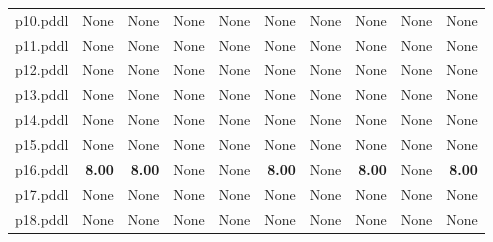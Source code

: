 \documentclass{article}
\begin{document}
\begin{tabular}{@{}lrrrrrrrrr@{}}
p10.pddl & \multicolumn{1}{|l|}{None} & \multicolumn{1}{|l|}{None} & \multicolumn{1}{|l|}{None} & \multicolumn{1}{|l|}{None} & \multicolumn{1}{|l|}{None} & \multicolumn{1}{|l|}{None} & \multicolumn{1}{|l|}{None} & \multicolumn{1}{|l|}{None} & \multicolumn{1}{|l|}{None} \\
p11.pddl & \multicolumn{1}{|l|}{None} & \multicolumn{1}{|l|}{None} & \multicolumn{1}{|l|}{None} & \multicolumn{1}{|l|}{None} & \multicolumn{1}{|l|}{None} & \multicolumn{1}{|l|}{None} & \multicolumn{1}{|l|}{None} & \multicolumn{1}{|l|}{None} & \multicolumn{1}{|l|}{None} \\
p12.pddl & \multicolumn{1}{|l|}{None} & \multicolumn{1}{|l|}{None} & \multicolumn{1}{|l|}{None} & \multicolumn{1}{|l|}{None} & \multicolumn{1}{|l|}{None} & \multicolumn{1}{|l|}{None} & \multicolumn{1}{|l|}{None} & \multicolumn{1}{|l|}{None} & \multicolumn{1}{|l|}{None} \\
p13.pddl & \multicolumn{1}{|l|}{None} & \multicolumn{1}{|l|}{None} & \multicolumn{1}{|l|}{None} & \multicolumn{1}{|l|}{None} & \multicolumn{1}{|l|}{None} & \multicolumn{1}{|l|}{None} & \multicolumn{1}{|l|}{None} & \multicolumn{1}{|l|}{None} & \multicolumn{1}{|l|}{None} \\
p14.pddl & \multicolumn{1}{|l|}{None} & \multicolumn{1}{|l|}{None} & \multicolumn{1}{|l|}{None} & \multicolumn{1}{|l|}{None} & \multicolumn{1}{|l|}{None} & \multicolumn{1}{|l|}{None} & \multicolumn{1}{|l|}{None} & \multicolumn{1}{|l|}{None} & \multicolumn{1}{|l|}{None} \\
p15.pddl & \multicolumn{1}{|l|}{None} & \multicolumn{1}{|l|}{None} & \multicolumn{1}{|l|}{None} & \multicolumn{1}{|l|}{None} & \multicolumn{1}{|l|}{None} & \multicolumn{1}{|l|}{None} & \multicolumn{1}{|l|}{None} & \multicolumn{1}{|l|}{None} & \multicolumn{1}{|l|}{None} \\
p16.pddl & \textbf{8.00} & \textbf{8.00} & \multicolumn{1}{|l|}{None} & \multicolumn{1}{|l|}{None} & \textbf{8.00} & \multicolumn{1}{|l|}{None} & \textbf{8.00} & \multicolumn{1}{|l|}{None} & \textbf{8.00} \\
p17.pddl & \multicolumn{1}{|l|}{None} & \multicolumn{1}{|l|}{None} & \multicolumn{1}{|l|}{None} & \multicolumn{1}{|l|}{None} & \multicolumn{1}{|l|}{None} & \multicolumn{1}{|l|}{None} & \multicolumn{1}{|l|}{None} & \multicolumn{1}{|l|}{None} & \multicolumn{1}{|l|}{None} \\
p18.pddl & \multicolumn{1}{|l|}{None} & \multicolumn{1}{|l|}{None} & \multicolumn{1}{|l|}{None} & \multicolumn{1}{|l|}{None} & \multicolumn{1}{|l|}{None} & \multicolumn{1}{|l|}{None} & \multicolumn{1}{|l|}{None} & \multicolumn{1}{|l|}{None} & \multicolumn{1}{|l|}{None} \\

\end{tabular}
\end{document}
